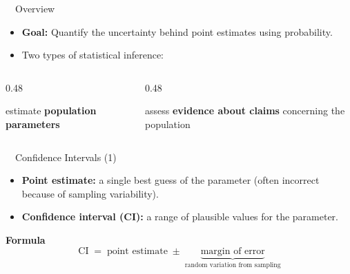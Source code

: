 \documentclass[aspectratio=169,11pt]{beamer}
\begin{document}
\begin{frame}{\ \ Overview}
  \begin{itemize}
    \item \textbf{Goal:} Quantify the uncertainty behind point estimates using probability.
    \item Two types of statistical inference:
  \end{itemize}
  \vspace{0.6em}
  \begin{columns}[T]
    \begin{column}{0.48\textwidth}
      \begin{tcolorbox}[colback=white,colframe=qrnavy,arc=3pt,halign title=center,
        title=\bfseries Confidence Intervals,coltitle=white,colbacktitle=qrnavy]
        \centering estimate \textbf{population parameters}
      \end{tcolorbox}
    \end{column}
    \begin{column}{0.48\textwidth}
      \begin{tcolorbox}[colback=white,colframe=qrnavy,arc=3pt,halign title=center,
        title=\bfseries Hypothesis Tests,coltitle=white,colbacktitle=qrnavy]
        \centering assess \textbf{evidence about claims} concerning the population
      \end{tcolorbox}
    \end{column}
  \end{columns}
\end{frame}

\begin{frame}{\ \ Confidence Intervals (1)}
  \begin{keybox}
    \begin{itemize}
      \item \textbf{Point estimate:} a single best guess of the parameter
            (often incorrect because of sampling variability).
      \item \textbf{Confidence interval (CI):} a range of plausible values for
            the parameter.
    \end{itemize}
  \end{keybox}
  \vspace{0.6em}
  \textbf{\color{qrnavy}Formula}
  \begin{equation*}
    \text{CI} \;=\; \text{point estimate} \;\pm\; \underbrace{\text{margin of error}}_{\text{random variation from sampling}}
  \end{equation*}
\end{frame}
\end{document}
